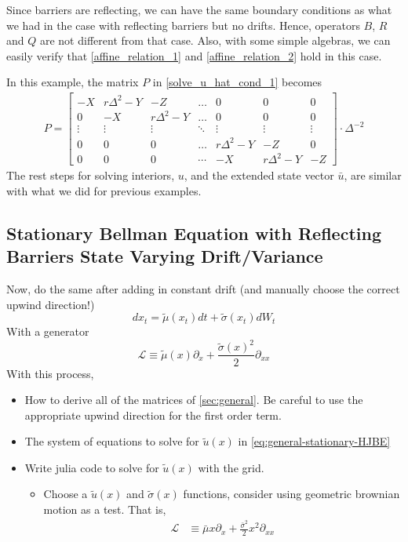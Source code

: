 \documentclass[11pt]{article}
\newcommand{\D}[1][]{\ensuremath{\partial_{#1}}}
\begin{document}
Since barriers are reflecting, we can have the same boundary conditions as what we had in the case with reflecting barriers but no drifts. Hence, operators $B$, $R$ and $Q$ are not different from that case. Also, with some simple algebras, we can easily verify that \eqref{affine_relation_1} and \eqref{affine_relation_2} hold in this case.

In this example, the matrix $P$ in \eqref{solve_u_hat_cond_1} becomes
\begin{align}
P = \begin{bmatrix}
-X&r\Delta^2-Y&-Z&\dots&0&0&0\\
0&-X&r\Delta^2-Y&\dots&0&0&0\\
\vdots&\vdots&\vdots&\ddots&\vdots&\vdots&\vdots\\
0&0&0&\dots&r\Delta^2-Y&-Z&0\\
0&0&0&\cdots&-X&r\Delta^2-Y&-Z
\end{bmatrix}\cdot \Delta^{-2}
\end{align}
The rest steps for solving interiors, $u$, and the extended state vector $\bar{u}$, are similar with what we did for previous examples.


\subsection{Stationary Bellman Equation with Reflecting Barriers State Varying Drift/Variance}
Now, do the same after adding in constant drift (and manually choose the correct upwind direction!)
$$
d x_t = \tilde{\mu}(x_t) dt + \tilde{\sigma}(x_t) d W_t
$$
With a generator
$$
\mathcal{L} \equiv \tilde{\mu}(x) \D[x] + \frac{\tilde{\sigma}(x)^2}{2}\D[xx]
$$
With this process,
\begin{itemize}
	\item How to derive all of the matrices of \cref{sec:general}.  Be careful to use the appropriate upwind direction for the first order term.
	\item The system of equations to solve for $\tilde{u}(x)$ in \cref{eq:general-stationary-HJBE}
	\item Write julia code to solve for $\tilde{u}(x)$ with the grid.
	\begin{itemize}
		\item Choose a $\tilde{u}(x)$ and $\tilde{\sigma}(x)$ functions, consider using geometric brownian motion as a test.  That is,
		\begin{align}
			\mathcal{L} &\equiv \bar{\mu} x \D[x] + \frac{\bar{\sigma}^2}{2}x^2\D[xx]
		\end{align}
	\end{itemize}
\end{itemize}
\end{document}
